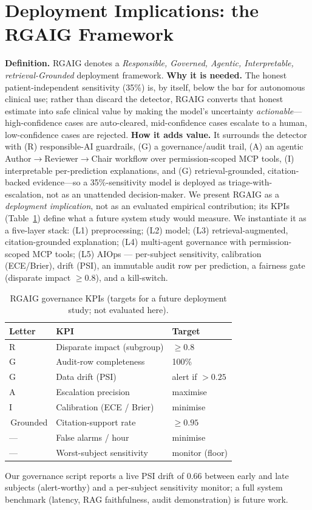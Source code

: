 \documentclass[10pt,journal,twocolumn]{IEEEtran}
\begin{document}
\section{Deployment Implications: the RGAIG Framework}\label{sec:rgaig}
\textbf{Definition.} RGAIG denotes a \emph{Responsible, Governed, Agentic, Interpretable, retrieval-Grounded} deployment framework. \textbf{Why it is needed.} The honest patient-independent sensitivity (35\%) is, by itself, below the bar for autonomous clinical use; rather than discard the detector, RGAIG converts that honest estimate into safe clinical value by making the model's uncertainty \emph{actionable}---high-confidence cases are auto-cleared, mid-confidence cases escalate to a human, low-confidence cases are rejected. \textbf{How it adds value.} It surrounds the detector with (R) responsible-AI guardrails, (G) a governance/audit trail, (A) an agentic Author$\rightarrow$Reviewer$\rightarrow$Chair workflow over permission-scoped MCP tools, (I) interpretable per-prediction explanations, and (G) retrieval-grounded, citation-backed evidence---so a 35\%-sensitivity model is deployed as triage-with-escalation, not as an unattended decision-maker. We present RGAIG as a \emph{deployment implication}, not as an evaluated empirical contribution; its KPIs (Table~\ref{tab:kpi}) define what a future system study would measure.
We instantiate it as a five-layer stack: (L1) preprocessing; (L2) model; (L3) retrieval-augmented, citation-grounded explanation; (L4) multi-agent governance with permission-scoped MCP tools; (L5) AIOps --- per-subject sensitivity, calibration (ECE/Brier), drift (PSI), an immutable audit row per prediction, a fairness gate (disparate impact $\geq0.8$), and a kill-switch.
\begin{table}[h]\centering\caption{RGAIG governance KPIs (targets for a future deployment study; not evaluated here).}\label{tab:kpi}
\begin{tabular}{lll}\toprule
Letter & KPI & Target\\\midrule
R & Disparate impact (subgroup) & $\geq 0.8$\\
G & Audit-row completeness & 100\%\\
G & Data drift (PSI) & alert if $>0.25$\\
A & Escalation precision & maximise\\
I & Calibration (ECE / Brier) & minimise\\
\,Grounded & Citation-support rate & $\geq 0.95$\\
--- & False alarms / hour & minimise\\
--- & Worst-subject sensitivity & monitor (floor)\\\bottomrule
\end{tabular}\end{table}
Our governance script reports a live PSI drift of 0.66 between early and late subjects (alert-worthy) and a per-subject sensitivity monitor; a full system benchmark (latency, RAG faithfulness, audit demonstration) is future work.
\end{document}
